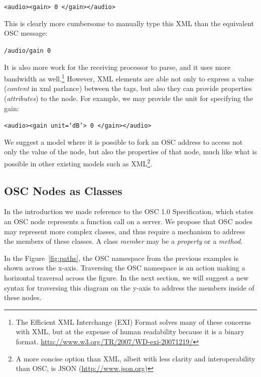 \documentclass{NIME-alternate}
\begin{document}
\texttt{<audio><gain> 0 </gain></audio>}

This is clearly more cumbersome to manually type this XML than the equivalent OSC message:

\texttt{/audio/gain 0}

It is also more work for the receiving processor to parse, and it uses more bandwidth as well.\footnote{The Efficient XML Interchange (EXI) Format solves many of these concerns with XML, but at the expense of human readability because it is a binary format.  \url{http://www.w3.org/TR/2007/WD-exi-20071219/}} However, XML elements are able not only to express a value (\emph{content} in xml parlance) between the tags, but also they can provide properties (\emph{attributes}) to the node. For example, we may provide the unit for specifying the gain:

\texttt{<audio><gain unit=`dB'> 0 </gain></audio>}

We suggest a model where it is possible to fork an OSC address to access not only the value of the node, but also the properties of that node, much like what is possible in other existing models such as XML\footnote{A more concise option than XML, albeit with less clarity and interoperability than OSC, is JSON (\url{http://www.json.org})}.  



\subsection{OSC Nodes as Classes} %
\label{sub:osc_nodes_as_classes}

In the introduction we made reference to the OSC 1.0 Specification, which states an OSC node represents a function call on a server. We propose that OSC nodes may represent more complex classes, and thus require a mechanism to address the members of these classes. A class \emph{member} may be a \emph{property} or a \emph{method}.

In the Figure~\ref{fig:paths}, the OSC namespace from the previous examples is shown across the x-axis. Traversing the OSC namespace is an action making a horizontal traversal across the figure.  In the next section, we will suggest a new syntax for traversing this diagram on the y-axis to address the members inside of these nodes.
\end{document}
